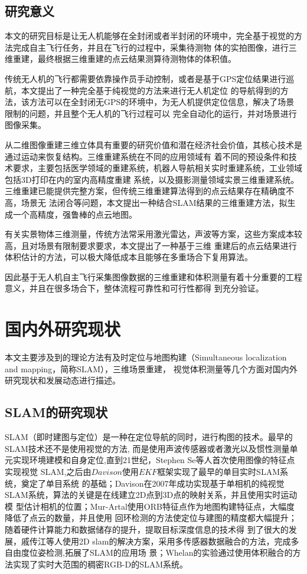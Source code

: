 \subsection{研究意义}
\label{sec:1.1.2}
本文的研究目标是让无人机能够在全封闭或者半封闭的环境中，完全基于视觉的方法完成自主飞行任务，并且在飞行的过程中，采集待测物
体的实拍图像，进行三维重建，最终根据三维重建的点云结果测算待测物体的体积值。

传统无人机的飞行都需要依靠操作员手动控制，或者是基于GPS定位结果进行巡航，本文提出了一种完全基于纯视觉的方法来进行无人机定位
的导航得到的方法，该方法可以在全封闭无GPS的环境中，为无人机提供定位信息，解决了场景限制的问题，并且整个无人机的飞行过程可以
完全自动化的运行，并对场景进行图像采集。

从二维图像重建三维立体具有重要的研究价值和潜在经济社会价值，其核心技术是通过运动来恢复结构。三维重建系统在不同的应用领域有
着不同的预设条件和技术要求，主要包括医学领域的重建系统，机器人导航相关实时重建系统，工业领域包括3D打印在内的室内高精度重建
系统，以及摄影测量领域实景三维重建系统。 三维重建已能提供完整方案，但传统三维重建算法得到的点云结果存在精确度不高，场景无
法闭合等问题，本文提出一种结合SLAM结果的三维重建方法，拟生成一个高精度，强鲁棒的点云地图。

有关实景物体三维测量，传统方法常采用激光雷达，声波等方案，这些方案成本较高，且对场景有限制要求要求，本文提出了一种基于三维
重建后的点云结果进行体积估计的方法，可以极大降低成本且能够在多重场合下复用算法。

因此基于无人机自主飞行采集图像数据的三维重建和体积测量有着十分重要的工程意义，并且在很多场合下，整体流程可靠性和可行性都得
到充分验证。


\section{国内外研究现状}
\label{sec:1.2}
本文主要涉及到的理论方法有及时定位与地图构建（Simultaneous localization and mapping，简称SLAM），三维场景重建，
视觉体积测量等几个方面对国内外研究现状和发展动态进行描述。
\subsection{SLAM的研究现状}
\label{sec:1.2.1}
SLAM（即时建图与定位）是一种在定位导航的同时，进行构图的技术\cite{cadena2016past}。最早的SLAM技术还不是使用视觉的方法,
而是使用声波传感器或者激光以及惯性测量单元实现环境建模和自身定位,直到21世纪，Stephen Se等人首次使用图像的特征点实现视觉
SLAM\cite{se2002mobile},之后由$Davison$使用$EKF$框架实现了最早的单目实时SLAM系统\cite{davison2003real}，奠定了单目系统
的基础；Davison在2007年成功实现基于单相机的纯视觉SLAM系统，算法的关键是在线建立2D点到3D点的映射关系，并且使用实时运动模
型估计相机的位置\cite{davison2007monoslam}；Mur-Artal使用ORB特征点作为地图构建特征点，大幅度降低了点云的数量，并且使用
回环检测的方法使定位与建图的精度都大幅提升\cite{mur2015orb}；随着硬件计算能力和数据储存的提升，提取目标深度信息的技术得
到了很大的发展，戚传江等人使用2D slam的解决方案，采用多传感器数据融合的方法，完成多自由度位姿检测,拓展了SLAM的应用场
景；Whelan的实验通过使用体积融合的方法实现了实时大范围的稠密RGB-D的SLAM系统\cite{whelan2015real}。

